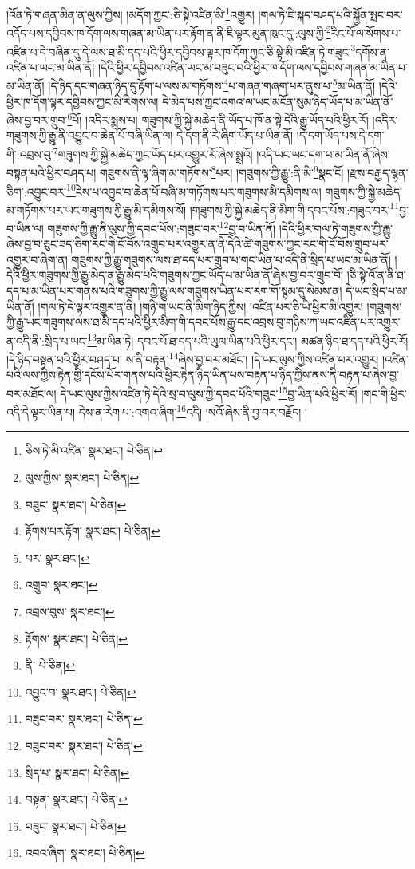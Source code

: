 །འོན་ཏེ་གཞན་མིན་ན་ལུས་ཀྱིས། །མདོག་ཀྱང་:ཅི་སྟེ་འཛིན་མི་\footnote{ཅིས་ཏེ་མི་འཛིན་  སྣར་ཐང་།  པེ་ཅིན། }འགྱུར། །གལ་ཏེ་ཇི་སྐད་བཤད་པའི་སྐྱོན་སྤང་བར་འདོད་པས་དབྱིབས་ཁ་དོག་ལས་གཞན་མ་ཡིན་པར་རྟོག་ན་ནི་ཇི་ལྟར་མུན་ཁུང་དུ་:ལུས་ཀྱི་\footnote{ལུས་ཀྱིས་  སྣར་ཐང་།  པེ་ཅིན། }རིང་པོ་ལ་སོགས་པ་འཛིན་པ་དེ་བཞིན་དུ་དེ་ལས་ཐ་མི་དད་པའི་ཕྱིར་དབྱིབས་ལྟར་ཁ་དོག་ཀྱང་ཅི་སྟེ་མི་འཛིན་ཏེ་གཟུང་\footnote{བཟུང་  སྣར་ཐང་།  པེ་ཅིན། }དགོས་ན་འཛིན་པ་ཡང་མ་ཡིན་ནོ། །དེའི་ཕྱིར་དབྱིབས་འཛིན་ཡང་མ་བཟུང་བའི་ཕྱིར་ཁ་དོག་ལས་དབྱིབས་གཞན་མ་ཡིན་པ་མ་ཡིན་ནོ། །དེ་ཉིད་དང་གཞན་ཉིད་དུ་རྟོག་པ་ལས་མ་གཏོགས་\footnote{རྟོགས་པར་རྟོག་  སྣར་ཐང་།  པེ་ཅིན། }པ་གཞན་གཞག་པར་ནུས་པ་\footnote{པར་  སྣར་ཐང་། }མ་ཡིན་ནོ། །དེའི་ཕྱིར་ཁ་དོག་ལྟར་དབྱིབས་ཀྱང་མི་རིགས་ལ། དེ་མེད་པས་ཀྱང་འགའ་ལ་ཡང་མངོན་སུམ་ཉིད་ཡོད་པ་མ་ཡིན་ནོ་ཞེས་བྱ་བར་གྲུབ་\footnote{འགྲུབ་  སྣར་ཐང་། }པོ། །འདིར་སྨྲས་པ། གཟུགས་ཀྱི་སྐྱེ་མཆེད་ནི་ཡོད་པ་ཁོ་ན་སྟེ་དེའི་རྒྱུ་ཡོད་པའི་ཕྱིར་རོ། །འདིར་གཟུགས་ཀྱི་རྒྱུ་ནི་འབྱུང་བ་ཆེན་པོ་བཞི་ཡིན་ལ། དེ་དག་ནི་རེ་ཞིག་ཡོད་པ་ཡིན་ནོ། །དེ་དག་ཡོད་པས་དེ་དག་གི་:འབྲས་བུ་\footnote{འབྲས་བུས་  སྣར་ཐང་། }གཟུགས་ཀྱི་སྐྱེ་མཆེད་ཀྱང་ཡོད་པར་འགྱུར་རོ་ཞེས་སྨྲའོ། །འདི་ཡང་ཡང་དག་པ་མ་ཡིན་ནོ་ཞེས་བསྟན་པའི་ཕྱིར་བཤད་པ། གཟུགས་ནི་ལྟ་ཞིག་མ་གཏོགས་\footnote{རྟོགས་  སྣར་ཐང་།  པེ་ཅིན། }པར། །གཟུགས་ཀྱི་རྒྱུ་:ནི་མི་\footnote{ནི་  པེ་ཅིན། }སྣང་ངོ། །རྫས་བརྒྱད་ལྷན་ཅིག་:འབྱུང་བར་\footnote{འབྱུང་བ་  སྣར་ཐང་།  པེ་ཅིན། }ངེས་པ་འབྱུང་བ་ཆེན་པོ་བཞི་མ་གཏོགས་པར་གཟུགས་མི་དམིགས་ལ། གཟུགས་ཀྱི་སྐྱེ་མཆེད་མ་གཏོགས་པར་ཡང་གཟུགས་ཀྱི་རྒྱུ་མི་དམིགས་སོ། །གཟུགས་ཀྱི་སྐྱེ་མཆེད་ནི་མིག་གི་དབང་པོས་:གཟུང་བར་\footnote{བཟུང་བར་  སྣར་ཐང་།  པེ་ཅིན། }བྱ་བ་ཡིན་ལ། གཟུགས་ཀྱི་རྒྱུ་ནི་ལུས་ཀྱི་དབང་པོས་:གཟུང་བར་\footnote{བཟུང་བར་  སྣར་ཐང་།  པེ་ཅིན། }བྱ་བ་ཡིན་ནོ། །དེའི་ཕྱིར་གལ་ཏེ་གཟུགས་ཀྱི་རྒྱུ་ཞེས་བྱ་བ་ཅུང་ཟད་ཅིག་རང་གི་ངོ་བོས་འགྲུབ་པར་འགྱུར་ན་ནི་དེའི་ཚེ་གཟུགས་ཀྱང་རང་གི་ངོ་བོས་གྲུབ་པར་འགྱུར་བ་ཞིག་ན། གཟུགས་ཀྱི་རྒྱུ་གཟུགས་ལས་ཐ་དད་པར་གྲུབ་པ་གང་ཡིན་པ་འདི་ནི་སྲིད་པ་ཡང་མ་ཡིན་ནོ། །དེའི་ཕྱིར་གཟུགས་ཀྱི་རྒྱུ་མེད་ན་རྒྱུ་མེད་པའི་གཟུགས་ཀྱང་ཡོད་པ་མ་ཡིན་ནོ་ཞེས་བྱ་བར་གྲུབ་བོ། །ཅི་སྟེ་འོ་ན་ནི་ཐ་དད་པ་མ་ཡིན་པར་གནས་པའི་གཟུགས་ཀྱི་རྒྱུ་ལས་གཟུགས་ཡིན་པར་རག་གོ་སྙམ་དུ་སེམས་ན། དེ་ཡང་སྲིད་པ་མ་ཡིན་ནོ། །གལ་ཏེ་དེ་ལྟར་འགྱུར་ན་ནི། །གཉི་ག་ཡང་ནི་མིག་ཉིད་ཀྱིས། །འཛིན་པར་ཅི་ཡི་ཕྱིར་མི་འགྱུར། །གཟུགས་ཀྱི་རྒྱུ་ཡང་གཟུགས་ལས་ཐ་མི་དད་པའི་ཕྱིར་མིག་གི་དབང་པོས་རྒྱུ་དང་འབྲས་བུ་གཉིས་ཀ་ཡང་འཛིན་པར་འགྱུར་ན་འདི་ནི་:སྲིད་པ་ཡང་\footnote{སྲིད་པ་  སྣར་ཐང་།  པེ་ཅིན། }མ་ཡིན་ཏེ། དབང་པོ་ཐ་དད་པའི་ཡུལ་ཡིན་པའི་ཕྱིར་དང་། མཚན་ཉིད་ཐ་དད་པའི་ཕྱིར་རོ། །དེ་ཉིད་བསྟན་པའི་ཕྱིར་བཤད་པ། ས་ནི་བརྟན་\footnote{བསྟན་  སྣར་ཐང་།  པེ་ཅིན། }ཞེས་བྱ་བར་མཐོང་། །དེ་ཡང་ལུས་ཀྱིས་འཛིན་པར་འགྱུར། །འཛིན་པའི་ལས་ཀྱིས་རྟེན་གྱི་དངོས་པོར་གནས་པའི་ཕྱིར་རྟེན་ཉིད་ཡིན་པས་བརྟན་པ་ཉིད་ཀྱིས་ནས་ནི་བརྟན་པ་ཞེས་བྱ་བར་མཐོང་ལ། དེ་ཡང་ལུས་ཀྱིས་འཛིན་ཏེ་དེའི་སྲ་བ་ལུས་ཀྱི་དབང་པོའི་གཟུང་\footnote{བཟུང་  སྣར་ཐང་།  པེ་ཅིན། }བྱ་ཡིན་པའི་ཕྱིར་རོ། །གང་གི་ཕྱིར་འདི་དེ་ལྟར་ཡིན་པ། དེས་ན་རེག་པ་:འགའ་ཞིག་\footnote{འབའ་ཞིག་  སྣར་ཐང་།  པེ་ཅིན། }འདི། །སའོ་ཞེས་ནི་བྱ་བར་བརྗོད། །

